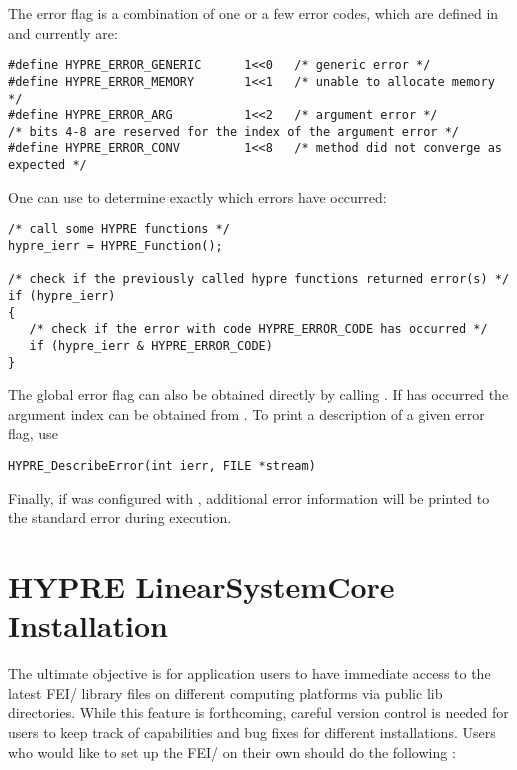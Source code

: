 The error flag is a combination of one or a few error codes, which are
defined in  and currently are:
\begin{display} \begin{verbatim}
#define HYPRE_ERROR_GENERIC      1<<0   /* generic error */
#define HYPRE_ERROR_MEMORY       1<<1   /* unable to allocate memory */
#define HYPRE_ERROR_ARG          1<<2   /* argument error */
/* bits 4-8 are reserved for the index of the argument error */
#define HYPRE_ERROR_CONV         1<<8   /* method did not converge as expected */
\end{verbatim} \end{display}

One can use \code{&} to determine exactly which errors have occurred:
\begin{display} \begin{verbatim}
/* call some HYPRE functions */
hypre_ierr = HYPRE_Function();

/* check if the previously called hypre functions returned error(s) */
if (hypre_ierr)
{
   /* check if the error with code HYPRE_ERROR_CODE has occurred */
   if (hypre_ierr & HYPRE_ERROR_CODE)
}
\end{verbatim} \end{display}

The global error flag can also be obtained directly by
calling . If 
has occurred the argument index can be obtained from .
To print a description of a given error flag, use
\begin{display} \begin{verbatim}
HYPRE_DescribeError(int ierr, FILE *stream)
\end{verbatim} \end{display}
Finally, if \hypre{} was configured with , additional
error information will be printed to the standard error during execution.


\section{HYPRE LinearSystemCore Installation}
\label{LSI_install}

The ultimate objective is for application users to have immediate access
to the latest FEI/\hypre{} library files on different computing platforms
via public {\sf lib} directories.  While this feature is forthcoming, careful 
version control is needed for users to keep track of capabilities and bug fixes 
for different installations.  Users who would like to set up the FEI/\hypre{}
on their own should do the following :

